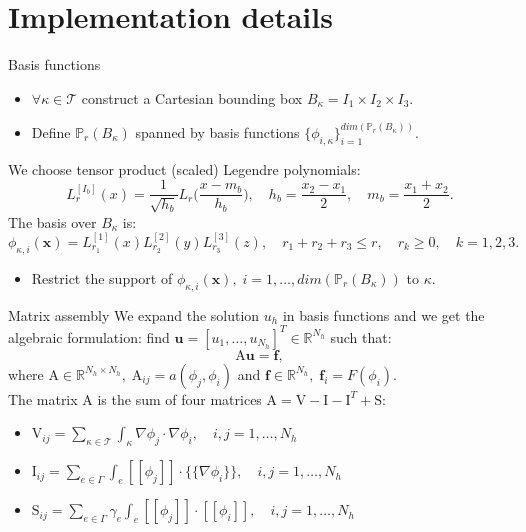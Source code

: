 \documentclass{beamer}
\begin{document}
\section{Implementation details}
\begin{frame}{Basis functions}
	\begin{itemize}
		\item $\forall \kappa \in \mathcal{T}$ construct a Cartesian bounding
		box $B_\kappa=I_1\times I_2 \times I_3$.
		\item Define $\mathbb{P}_r(B_\kappa)$ spanned by basis
		functions $\{ \phi_{i,\kappa} \}_{i=1}^{dim(\mathbb{P}_r(B_\kappa))}$.
	\end{itemize}
	We choose tensor product (scaled) Legendre polynomials:
	\begin{equation*}
	L_r^{[I_b]} (x) = \frac{1}{\sqrt{h_b}} L_r \bigg( \frac{x-m_b}{h_b} \bigg),
	\quad h_b = \frac{x_2-x_1}{2}, \quad m_b=\frac{x_1+x_2}{2}.
	\end{equation*}
	The basis over $B_\kappa$ is:
	\begin{equation*}
	\phi_{\kappa,i}(\mathbf{x}) =
	L_{r_1}^{[1]}(x)L_{r_2}^{[2]}(y)L_{r_3}^{[3]}(z), \quad
	r_1+r_2+r_3 \leq r, \quad r_k \geq 0, \quad k = 1,2,3.
	\end{equation*}
	\begin{itemize}
		\item Restrict the support of $\phi_{\kappa, i}(\mathbf{x}), \;
		i=1,\dots,dim(\mathbb{P}_r(B_\kappa))$ to $\kappa$.
	\end{itemize}
\end{frame}
\begin{frame}{Matrix assembly}
	We expand the solution $u_h$ in basis functions and we get the
	algebraic formulation: find $\mathbf{u} = [u_1, \dots, u_{N_h}]^T \in
	\mathbb{R}^{N_h} $ such that:
	\begin{equation*}
	\mathrm{A}\mathbf{u} = \mathbf{f},
	\end{equation*}
	where $\mathrm{A} \in \mathbb{R}^{N_h \times N_h}, \; \mathrm{A}_{ij} =
	a(\phi_j, \phi_i)$ and $\mathbf{f} \in \mathbb{R}^{N_h}, \; \mathbf{f}_i =
	F(\phi_i)$.\\
	\vspace*{0.4cm}
	The matrix $\mathrm{A}$ is the sum of four matrices $\mathrm{A} =
	\mathrm{V} - \mathrm{I} - \mathrm{I}^T + \mathrm{S}$:\\
	\begin{itemize}
		\item $\mathrm{V}_{ij} = \sum\limits_{\kappa \in \mathcal{T}}
		\int_\kappa
		\nabla \phi_j \cdot \nabla \phi_i, \quad i,j=1,\dots,N_h$
		\item $\mathrm{I}_{ij} = \sum\limits_{e \in \Gamma} \int_e
		[\![\phi_j]\!]
		\cdot \{\!\!\{ \nabla \phi_i \}\!\!\}, \quad i,j=1,\dots,N_h$
		\item $\mathrm{S}_{ij} = \sum\limits_{e \in \Gamma} \gamma_e \int_e
		[\![
		\phi_j ]\!] \cdot [\![ \phi_i ]\!], \quad i,j=1,\dots,N_h$
	\end{itemize}
\end{frame}
\end{document}
